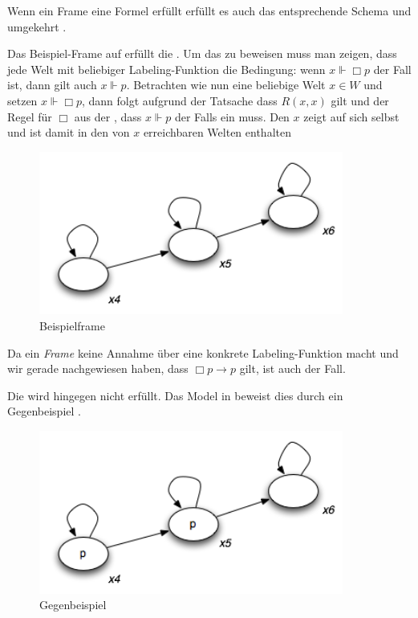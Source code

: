 Wenn ein Frame eine Formel erfüllt erfüllt es auch das entsprechende Schema und umgekehrt .

\begin{example}
	Das Beispiel-Frame auf  erfüllt die \TFormel.
	Um das zu beweisen muss man zeigen, dass jede Welt mit beliebiger Labeling-Funktion die Bedingung: wenn $x \Vdash \Box p$ der Fall ist, dann gilt auch $x \Vdash p$.
	Betrachten wie nun eine beliebige Welt $x \in W$ und setzen $x \Vdash \Box p$, dann folgt aufgrund der Tatsache dass $R(x,x)$ gilt und der Regel für $\Box$ aus der , dass $x \Vdash p$ der Falls ein muss.
	Den $x$ zeigt auf sich selbst und ist damit in den von $x$ erreichbaren Welten enthalten

	\begin{figure}[h!]
		\label{fig:Kripke02}
		\centering
		\includegraphics[width=10cm]{Images/Kripke02}
		\caption{Beispielframe}
	\end{figure}

	Da ein \emph{Frame} keine Annahme über eine konkrete Labeling-Funktion macht und wir gerade nachgewiesen haben, dass $\Box p \rightarrow p$ gilt, ist auch \TFormel der Fall.
	
	Die \vierFormel wird hingegen nicht erfüllt.
	Das Model in  beweist dies durch ein Gegenbeispiel
	.

	\begin{figure}[h!]
		\label{fig:Kripke03}
		\centering
		\includegraphics[width=10cm]{Images/Kripke03}
		\caption{Gegenbeispiel}
	\end{figure}

\end{example}

